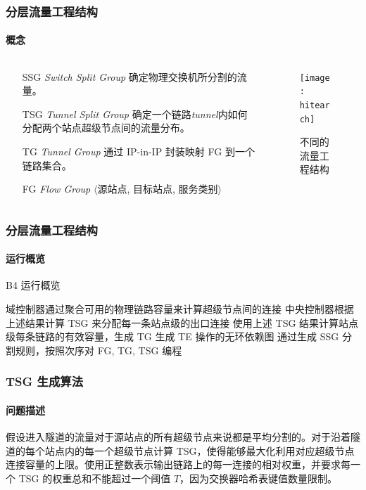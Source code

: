 \begin{frame}
    \frametitle{分层流量工程结构}
    \framesubtitle{概念}
    \begin{columns}
        \begin{column}{0.6\textwidth}
            \begin{itemize}
                \item[SSG] \emph{Switch Split Group} 确定物理交换机所分割的流量。
                \item[TSG] \emph{Tunnel Split Group} 确定一个链路\emph{tunnel}内如何分配两个站点超级节点间的流量分布。
                \item[TG] \emph{Tunnel Group} 通过 IP-in-IP 封装映射 FG 到一个链路集合。
                \item[FG] \emph{Flow Group} $\langle$源站点, 目标站点, 服务类别$\rangle$
            \end{itemize}
        \end{column}
        \begin{column}{0.4\textwidth}
            \begin{figure}
                \centering
                \texttt{[image: hitearch]}
                \caption{不同的流量工程结构}
            \end{figure}
        \end{column}
    \end{columns}
\end{frame}

\begin{frame}
    \frametitle{分层流量工程结构}
    \framesubtitle{运行概览}
    \begin{algorithm}[H]
        \caption{B4 运行概览}
        域控制器通过聚合可用的物理链路容量来计算超级节点间的连接\;
        中央控制器根据上述结果计算 TSG 来分配每一条站点级的出口连接\;
        使用上述 TSG 结果计算站点级每条链路的有效容量，生成 TG\;
        生成 TE 操作的无环依赖图\;
        通过生成 SSG 分割规则，按照次序对 FG, TG, TSG 编程\;
    \end{algorithm}
\end{frame}

\begin{frame}
    \frametitle{TSG 生成算法}
    \framesubtitle{问题描述}
    假设进入隧道的流量对于源站点的所有超级节点来说都是平均分割的。对于沿着隧道的每个站点内的每一个超级节点计算 TSG，使得能够最大化利用对应超级节点连接容量的上限。使用正整数表示输出链路上的每一连接的相对权重，并要求每一个 TSG 的权重总和不能超过一个阈值 $T$，因为交换器哈希表键值数量限制。
\end{frame}

